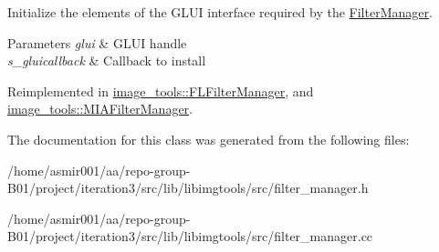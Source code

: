 Initialize the elements of the G\+L\+UI interface required by the \hyperlink{classimage__tools_1_1FilterManager}{Filter\+Manager}. 


\begin{DoxyParams}{Parameters}
{\em glui} & G\+L\+UI handle \\
\hline
{\em s\+\_\+gluicallback} & Callback to install \\
\hline
\end{DoxyParams}


Reimplemented in \hyperlink{classimage__tools_1_1FLFilterManager_ad87732017634c46c14d52982f2af5306}{image\+\_\+tools\+::\+F\+L\+Filter\+Manager}, and \hyperlink{classimage__tools_1_1MIAFilterManager_a9edb4c699c3349d444e59bdff820f731}{image\+\_\+tools\+::\+M\+I\+A\+Filter\+Manager}.



The documentation for this class was generated from the following files\+:\begin{DoxyCompactItemize}
\item 
/home/asmir001/aa/repo-\/group-\/\+B01/project/iteration3/src/lib/libimgtools/src/filter\+\_\+manager.\+h\item 
/home/asmir001/aa/repo-\/group-\/\+B01/project/iteration3/src/lib/libimgtools/src/filter\+\_\+manager.\+cc\end{DoxyCompactItemize}
